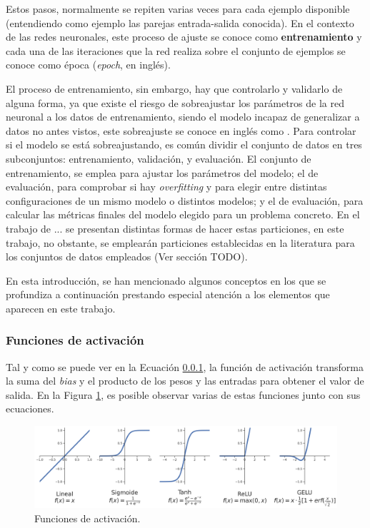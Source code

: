 Estos pasos, normalmente se repiten varias veces para cada ejemplo disponible (entendiendo como ejemplo las parejas entrada-salida conocida). En el contexto de las redes neuronales, este proceso de ajuste se conoce como \textbf{entrenamiento} y cada una de las iteraciones que la red realiza sobre el conjunto de ejemplos se conoce como época (\textit{epoch}, en inglés). 

El proceso de entrenamiento, sin embargo, hay que controlarlo y validarlo de alguna forma, ya que existe el riesgo de sobreajustar los parámetros de la red neuronal a los datos de entrenamiento, siendo el modelo incapaz de generalizar a datos no antes vistos, este sobreajuste se conoce en inglés como . Para controlar si el modelo se está sobreajustando, es común dividir el conjunto de datos en tres subconjuntos: entrenamiento, validación, y evaluación. El conjunto de entrenamiento, se emplea para ajustar los parámetros del modelo; el de evaluación, para comprobar si hay \textit{overfitting} y para elegir entre distintas configuraciones de un mismo modelo o distintos modelos; y el de evaluación, para calcular las métricas finales del modelo elegido para un problema concreto. En el trabajo de ... \cite{El paper ese de 50 páginas con splits} se presentan distintas formas de hacer estas particiones, en este trabajo, no obstante, se emplearán particiones establecidas en la literatura para los conjuntos de datos empleados (Ver sección TODO).


En esta introducción, se han mencionado algunos conceptos en los que se profundiza a continuación prestando especial atención a los elementos que aparecen en este trabajo.

\subsubsection{Funciones de activación}
Tal y como se puede ver en la Ecuación \ref{}, la función de activación transforma la suma del \textit{bias} y el producto de los pesos y las entradas para obtener el valor de salida. En la Figura \ref{fig:funciones-activacion}, es posible observar varias de estas funciones junto con sus ecuaciones.

\begin{figure}[H]
\centering
\includegraphics[width=\linewidth]{imagenes/funciones_activacion.png} 
\captionsetup{width=.8\linewidth}
\caption{Funciones de activación.}
\label{fig:funciones-activacion}
\end{figure}

